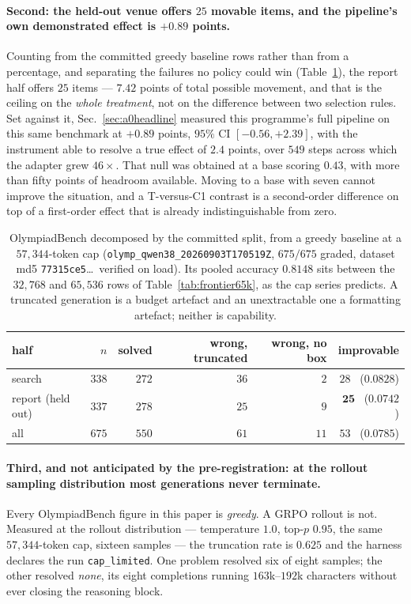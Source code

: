 \paragraph{Second: the held-out venue offers $25$ movable items, and the pipeline's own
demonstrated effect is $+0.89$ points.} Counting from the committed greedy baseline rows
rather than from a percentage, and separating the failures no policy could win
(Table~\ref{tab:movable}), the report half offers $25$ items --- $7.42$ points of total
possible movement, and that is the ceiling on the \emph{whole treatment}, not on the
difference between two selection rules. Set against it,
Sec.~\ref{sec:a0headline} measured this programme's full pipeline on this same benchmark at
$+0.89$ points, $95\%$ CI $[-0.56,+2.39]$, with the instrument able to resolve a true effect
of $2.4$ points, over $549$ steps across which the adapter grew $46\times$. That null was
obtained at a base scoring $0.43$, with more than fifty points of headroom available. Moving
to a base with seven cannot improve the situation, and a T-versus-C1 contrast is a
second-order difference on top of a first-order effect that is already indistinguishable from
zero.

\begin{table}[t]
\centering\small
\caption{OlympiadBench decomposed by the committed split, from a greedy baseline at a
$57{,}344$-token cap (\texttt{olymp\_qwen38\_20260903T170519Z}, $675/675$ graded, dataset md5
\texttt{77315ce5}\ldots\ verified on load). Its pooled accuracy $0.8148$ sits between the
$32{,}768$ and $65{,}536$ rows of Table~\ref{tab:frontier65k}, as the cap series predicts. A
truncated generation is a budget artefact and an unextractable one a formatting artefact;
neither is capability.}
\label{tab:movable}
\begin{tabular}{lrrrrr}
\toprule
half & $n$ & solved & wrong, truncated & wrong, no box & \textbf{improvable} \\
\midrule
search            & $338$ & $272$ & $36$ & $2$  & $28$ \ ($0.0828$) \\
report (held out) & $337$ & $278$ & $25$ & $9$  & $\mathbf{25}$ \ ($\mathbf{0.0742}$) \\
all               & $675$ & $550$ & $61$ & $11$ & $53$ \ ($0.0785$) \\
\bottomrule
\end{tabular}
\end{table}

\paragraph{Third, and not anticipated by the pre-registration: at the rollout sampling
distribution most generations never terminate.} Every OlympiadBench figure in this paper is
\emph{greedy}. A GRPO rollout is not. Measured at the rollout distribution --- temperature
$1.0$, top-$p$ $0.95$, the same $57{,}344$-token cap, sixteen samples --- the truncation rate
is $\mathbf{0.625}$ and the harness declares the run \texttt{cap\_limited}. One problem
resolved six of eight samples; the other resolved \emph{none}, its eight completions running
$163$k--$192$k characters without ever closing the reasoning block.

